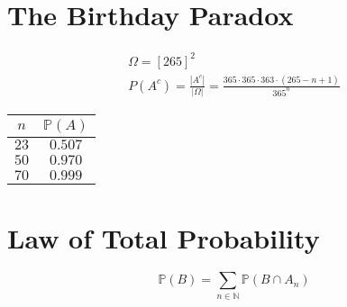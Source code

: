 \documentclass[00_complete]{subfiles}
\begin{document}
\section{The Birthday Paradox}
\begin{gather*}
    \Omega=[265]^2 \\
    P(A^c)=\frac{|A^c|}{|\Omega|}=\frac{365\cdot365\cdot363\cdot
    (265-n+1)}{365^n}
\end{gather*}

\begin{table}[ht!]
\centering
{\renewcommand{\arraystretch}{1.2}%
\begin{tabular}{ c|c}
    $n$ & $\mathbb{P}(A)$\\
    \hline
    $23$ & $0.507$ \\
    $50$ & $0.970$ \\
    $70$ & $0.999$
\end{tabular}}
\end{table}
\section{Law of Total Probability}
\[
    \mathbb{P}(B)=\sum_{n \in \mathbb{N}} \mathbb{P}(B\cap A_n)
\]
\end{document}
